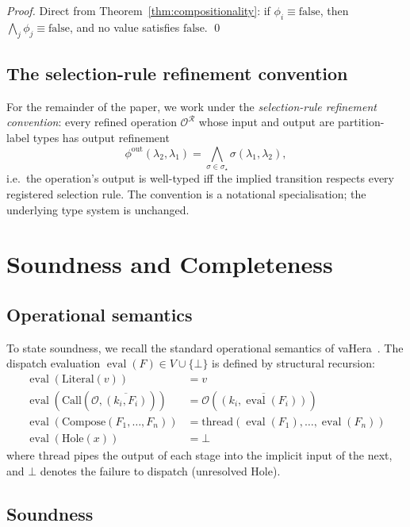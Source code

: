 \documentclass[twocolumn,11pt,a4paper]{article}
\DeclareMathOperator{\eval}{eval}
\newcommand{\Reg}{\mathcal{R}}
\newcommand{\Sel}{\sigma}
\newcommand{\Frag}{F}
\newcommand{\Op}{\mathcal{O}}
\newcommand{\Val}{V}
\newcommand{\vCall}[2]{\mathrm{Call}(#1,#2)}
\newcommand{\vComp}[1]{\mathrm{Compose}(#1)}
\newcommand{\vLit}[1]{\mathrm{Literal}(#1)}
\newcommand{\vHol}[1]{\mathrm{Hole}(#1)}
\begin{document}
\begin{proof}
Direct from Theorem~\ref{thm:compositionality}: if $\phi_i \equiv \mathrm{false}$, then $\bigwedge_j \phi_j \equiv \mathrm{false}$, and no value satisfies $\mathrm{false}$. \qed
\end{proof}

\subsection{The selection-rule refinement convention}

For the remainder of the paper, we work under the \emph{selection-rule refinement convention}: every refined operation $\Op^\Reg$ whose input and output are partition-label types has output refinement
\[
\phi^{\mathrm{out}}(\lambda_2, \lambda_1) = \bigwedge_{\Sel \in \Sel_\star} \Sel(\lambda_1, \lambda_2),
\]
i.e.\ the operation's output is well-typed iff the implied transition respects every registered selection rule. The convention is a notational specialisation; the underlying type system is unchanged.

\section{Soundness and Completeness}
\label{sec:soundness}

\subsection{Operational semantics}

To state soundness, we recall the standard operational semantics of vaHera~\citep{sachikonye2026integration}. The dispatch evaluation $\eval(\Frag) \in \Val \cup \{\bot\}$ is defined by structural recursion:
\begin{align*}
\eval(\vLit{v}) &= v\\
\eval(\vCall{\Op}{\overline{(k_i, \Frag_i)}}) &= \Op(\overline{(k_i, \eval(\Frag_i))})\\
\eval(\vComp{\Frag_1, \ldots, \Frag_n}) &= \mathrm{thread}(\eval(\Frag_1), \ldots, \eval(\Frag_n))\\
\eval(\vHol{x}) &= \bot
\end{align*}
where $\mathrm{thread}$ pipes the output of each stage into the implicit input of the next, and $\bot$ denotes the failure to dispatch (unresolved Hole).

\subsection{Soundness}
\end{document}
